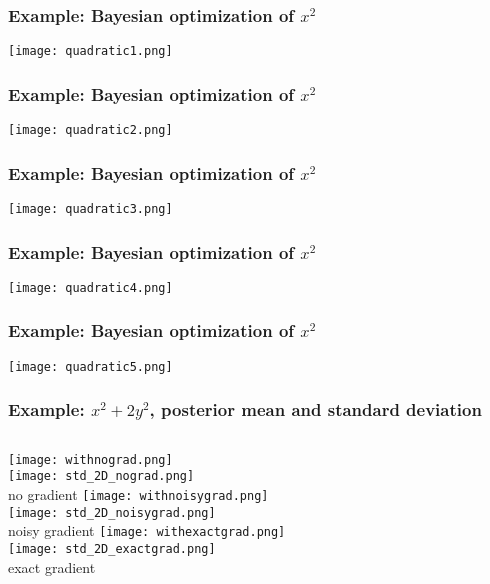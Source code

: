 \documentclass{beamer}
\begin{document}
\begin{frame}
    \frametitle{Example: Bayesian optimization of $x^2$}
    \begin{center}
    \texttt{[image: quadratic1.png]}
    \end{center}
\end{frame}
\begin{frame}
    \frametitle{Example: Bayesian optimization of $x^2$}
    \begin{center}
    \texttt{[image: quadratic2.png]}
    \end{center}
\end{frame}
\begin{frame}
    \frametitle{Example: Bayesian optimization of $x^2$}
    \begin{center}
    \texttt{[image: quadratic3.png]}
    \end{center}
\end{frame}
\begin{frame}
    \frametitle{Example: Bayesian optimization of $x^2$}
    \begin{center}
    \texttt{[image: quadratic4.png]}
    \end{center}
\end{frame}
\begin{frame}
    \frametitle{Example: Bayesian optimization of $x^2$}
    \begin{center}
    \texttt{[image: quadratic5.png]}
    \end{center}
\end{frame}

\begin{frame}
    \frametitle{Example: $x^2+2y^2$, posterior mean and standard deviation}
    \scriptsize
    \begin{columns}
        \centering
        \texttt{[image: withnograd.png]}\\\vspace{-0.15cm}
        \texttt{[image: std\_2D\_nograd.png]}\\
        no gradient
        \centering
        \texttt{[image: withnoisygrad.png]}\\\vspace{-0.15cm}
        \texttt{[image: std\_2D\_noisygrad.png]}\\
        noisy gradient
        \centering
        \texttt{[image: withexactgrad.png]}\\\vspace{-0.15cm}
        \texttt{[image: std\_2D\_exactgrad.png]}\\
        exact gradient
    \end{columns}
\end{frame}
\end{document}
